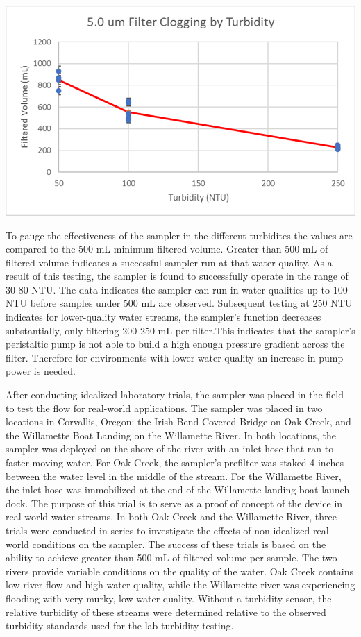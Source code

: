 \documentclass[11pt, letterpaper]{article}
\begin{document}
\begin{center}
	\includegraphics[scale=1]{./Assets/Turbidity.png}
\end{center}

To gauge the effectiveness of the sampler in the different turbidites the values are compared to the 500 mL minimum filtered volume. Greater than 500 mL of filtered volume indicates a successful sampler run at that water quality. As a result of this testing, the sampler is found to successfully operate in the range of 30-80 NTU. The data indicates the sampler can run in water qualities up to 100 NTU before samples under 500 mL are observed. Subsequent testing at 250 NTU indicates for lower-quality water streams, the sampler’s function decreases substantially, only filtering 200-250 mL per filter.This indicates that the sampler’s peristaltic pump is not able to build a high enough pressure gradient across the filter. Therefore for environments with lower water quality an increase in pump power is needed.
\newline\par
After conducting idealized laboratory trials, the sampler was placed in the field to test the flow for real-world applications. The sampler was placed in two locations in Corvallis, Oregon: the Irish Bend Covered Bridge on Oak Creek, and the Willamette Boat Landing on the Willamette River. In both locations, the sampler was deployed on the shore of the river with an inlet hose that ran to faster-moving water. For Oak Creek, the sampler’s prefilter was staked 4 inches between the water level in the middle of the stream. For the Willamette River, the inlet hose was immobilized at the end of the Willamette landing boat launch dock. The purpose of this trial is to serve as a proof of concept of the device in real world water streams. In both Oak Creek and the Willamette River, three trials were conducted in series to investigate the effects of non-idealized real world conditions on the sampler. The success of these trials is based on the ability to achieve greater than 500 mL of filtered volume per sample. The two rivers provide variable conditions on the quality of the water. Oak Creek contains low river flow and high water quality, while the Willamette river was experiencing flooding with very murky, low water quality. Without a turbidity sensor, the relative turbidity of these streams were determined relative to the observed turbidity standards used for the lab turbidity testing.
\end{document}
